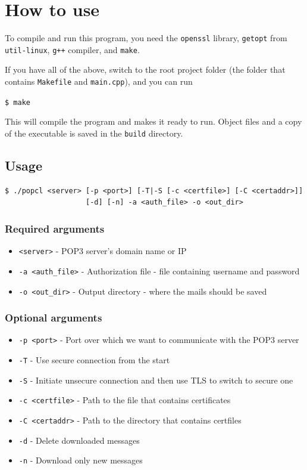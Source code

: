 \documentclass{article}
\begin{document}
\newpage

\section{How to use}
\par
To compile and run this program, you need the \verb|openssl| library, \verb|getopt| from \verb|util-linux|, \verb|g++| compiler, and \verb|make|.
\par
If you have all of the above, switch to the root project folder (the folder that contains \verb|Makefile| and \verb|main.cpp|), and you can run
\par
\verb|$ make|
\par
This will compile the program and makes it ready to run.
Object files and a copy of the executable is saved in the \verb|build| directory.

\subsection{Usage}
\begin{verbatim}
$ ./popcl <server> [-p <port>] [-T|-S [-c <certfile>] [-C <certaddr>]] 
                   [-d] [-n] -a <auth_file> -o <out_dir>
\end{verbatim}

\subsubsection{Required arguments}
\begin{itemize}
    \item \verb|<server>| - POP3 server's domain name or IP
    \item \verb|-a <auth_file>| - Authorization file - file containing username and password
    \item \verb|-o <out_dir>| - Output directory - where the mails should be saved
\end{itemize}
\subsubsection{Optional arguments}
\begin{itemize}
    \item \verb|-p <port>| - Port over which we want to communicate with the POP3 server
    \item \verb|-T| - Use secure connection from the start
    \item \verb|-S| - Initiate unsecure connection and then use TLS to switch to secure one
    \item \verb|-c <certfile>| - Path to the file that contains certificates
    \item \verb|-C <certaddr>| - Path to the directory that contains certfiles
    \item \verb|-d| - Delete downloaded messages
    \item \verb|-n| - Download only new messages
\end{itemize}
\end{document}

